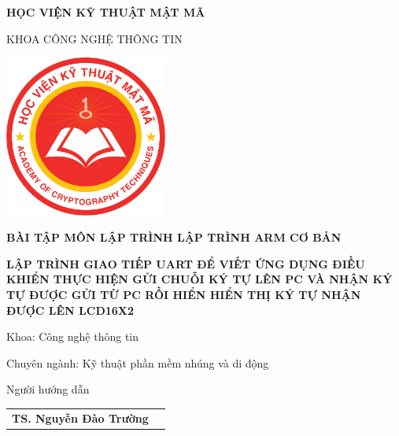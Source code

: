 \begin{titlepage}
	
	\begin{center}
		
		\textbf{HỌC VIỆN KỸ THUẬT MẬT MÃ}
		
		KHOA CÔNG NGHỆ THÔNG TIN
		
		\vspace{1cm}
		
		\includegraphics[width=0.4\textwidth]{images/kma.png}
		
		
		\vspace{2.2cm}
		
		\textbf{BÀI TẬP MÔN LẬP TRÌNH LẬP TRÌNH ARM CƠ BẢN}
		
		\vspace{0.2cm}
		
		\color{red}
		\textbf{LẬP TRÌNH GIAO TIẾP UART ĐỂ VIẾT ỨNG DỤNG ĐIỀU KHIỂN THỰC HIỆN GỬI CHUỖI KÝ TỰ LÊN PC VÀ NHẬN KÝ TỰ ĐƯỢC GỬI TỪ PC RỒI HIỂN HIỂN THỊ KÝ TỰ NHẬN ĐƯỢC LÊN LCD16X2}
		
		
		
	\end{center}
	
    \vspace{1cm}

	\begin{flushleft}        
		\hspace{3cm}
		Khoa: Công nghệ thông tin
		
		\hspace{3cm}
		Chuyên ngành: Kỹ thuật phần mềm nhúng và di động
		
		
		\vfill
		
		\hspace{3cm}
		
		\hspace{3cm}Người hướng dẫn
		
		\begin{tabular}{l c}
			
			\hspace{4cm}\textbf{TS. Nguyễn Đào Trường} \\
			

\end{tabular}
\end{flushleft}
\end{titlepage}
